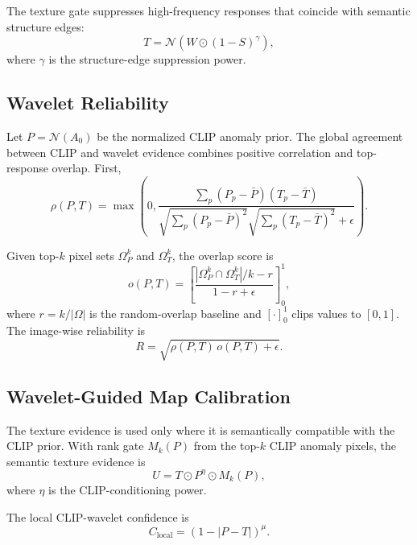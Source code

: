 The texture gate suppresses high-frequency responses that coincide with
semantic structure edges:
\begin{equation}
  T = \mathcal{N}\left(W \odot (1-S)^{\gamma}\right),
\end{equation}
where $\gamma$ is the structure-edge suppression power.

\subsection{Wavelet Reliability}
\label{subsec:formula_reliability}

Let $P=\mathcal{N}(A_0)$ be the normalized CLIP anomaly prior. The global
agreement between CLIP and wavelet evidence combines positive correlation and
top-response overlap. First,
\begin{equation}
  \rho(P,T)
  =
  \max
  \left(
    0,
    \frac{
      \sum_p (P_p-\bar{P})(T_p-\bar{T})
    }{
      \sqrt{\sum_p(P_p-\bar{P})^2}
      \sqrt{\sum_p(T_p-\bar{T})^2}
      + \epsilon
    }
  \right).
\end{equation}

Given top-$k$ pixel sets $\Omega_P^k$ and $\Omega_T^k$, the overlap score is
\begin{equation}
  o(P,T)
  =
  \left[
    \frac{
      |\Omega_P^k \cap \Omega_T^k|/k - r
    }{
      1-r+\epsilon
    }
  \right]_{0}^{1},
\end{equation}
where $r=k/|\Omega|$ is the random-overlap baseline and $[\cdot]_0^1$ clips
values to $[0,1]$. The image-wise reliability is
\begin{equation}
  R = \sqrt{\rho(P,T)\,o(P,T)+\epsilon}.
\end{equation}

\subsection{Wavelet-Guided Map Calibration}
\label{subsec:formula_wavelet_calibration}

The texture evidence is used only where it is semantically compatible with the
CLIP prior. With rank gate $M_k(P)$ from the top-$k$ CLIP anomaly pixels, the
semantic texture evidence is
\begin{equation}
  U = T \odot P^{\eta} \odot M_k(P),
\end{equation}
where $\eta$ is the CLIP-conditioning power.

The local CLIP-wavelet confidence is
\begin{equation}
  C_{\mathrm{local}} = \left(1-|P-T|\right)^{\mu}.
\end{equation}

